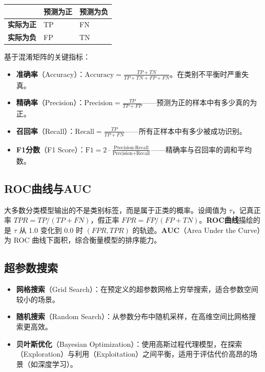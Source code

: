 \documentclass[
]{book}
\providecommand{\tightlist}{%
  \setlength{\itemsep}{0pt}\setlength{\parskip}{0pt}}
\begin{document}
\begin{longtable}[]{@{}lll@{}}
\toprule\noalign{}
& 预测为正 & 预测为负 \\
\midrule\noalign{}
\endhead
\bottomrule\noalign{}
\endlastfoot
\textbf{实际为正} & TP & FN \\
\textbf{实际为负} & FP & TN \\
\end{longtable}

基于混淆矩阵的关键指标：

\begin{itemize}
\tightlist
\item
  \textbf{准确率}（Accuracy）：\(\text{Accuracy} = \frac{TP + TN}{TP + TN + FP + FN}\)。在类别不平衡时严重失真。
\item
  \textbf{精确率}（Precision）：\(\text{Precision} = \frac{TP}{TP + FP}\)------预测为正的样本中有多少真的为正。
\item
  \textbf{召回率}（Recall）：\(\text{Recall} = \frac{TP}{TP + FN}\)------所有正样本中有多少被成功识别。
\item
  \textbf{F1分数}（F1 Score）：\(\text{F1} = 2 \cdot \frac{\text{Precision} \cdot \text{Recall}}{\text{Precision} + \text{Recall}}\)------精确率与召回率的调和平均数。
\end{itemize}

\subsection{ROC曲线与AUC}\label{rocux66f2ux7ebfux4e0eauc}

大多数分类模型输出的不是类别标签，而是属于正类的概率。设阈值为 \(\tau\)，记真正率 \(TPR = TP/(TP+FN)\)，假正率 \(FPR = FP/(FP+TN)\)。\textbf{ROC曲线}描绘的是 \(\tau\) 从 1.0 变化到 0.0 时 \((FPR, TPR)\) 的轨迹。\textbf{AUC}（Area Under the Curve）为 ROC 曲线下面积，综合衡量模型的排序能力。

\subsection{超参数搜索}\label{ux8d85ux53c2ux6570ux641cux7d22}

\begin{itemize}
\tightlist
\item
  \textbf{网格搜索}（Grid Search）：在预定义的超参数网格上穷举搜索，适合参数空间较小的场景。
\item
  \textbf{随机搜索}（Random Search）：从参数分布中随机采样，在高维空间比网格搜索更高效。
\item
  \textbf{贝叶斯优化}（Bayesian Optimization）：使用高斯过程代理模型，在探索（Exploration）与利用（Exploitation）之间平衡，适用于评估代价高昂的场景（如深度学习）。
\end{itemize}
\end{document}
